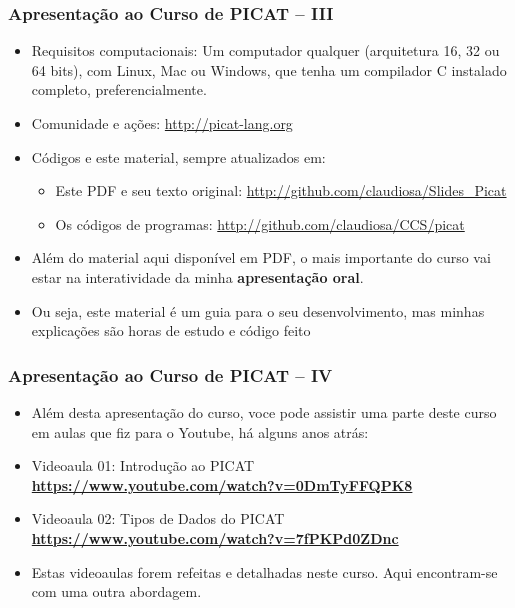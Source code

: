     
\begin{frame}[fragile]
  \frametitle{Apresentação ao Curso de PICAT -- III}
  \begin{itemize}

						
    \item Requisitos computacionais:
    \pause
    Um computador qualquer (arquitetura 16, 32 ou 64 bits), com Linux, Mac ou Windows,
    que tenha um compilador C instalado completo, preferencialmente.

    \item Comunidade e ações: \url{http://picat-lang.org}
    \pause

    \item Códigos e este material, sempre atualizados em: 
    \pause
    \begin{itemize}
      \item  Este PDF e seu texto original:  \url{http://github.com/claudiosa/Slides_Picat}
     \item   Os códigos de programas:  \url{http://github.com/claudiosa/CCS/picat}
    \end{itemize}

			\item Além do material aqui disponível em PDF, o mais importante  do curso
			 vai estar na interatividade
			da minha \textbf{apresentação oral}. 
			
			\item Ou seja, este material é  um guia para o seu desenvolvimento,
			 mas minhas explicações são
			horas de estudo e código feito

    
  \end{itemize}

\end{frame}


    
\begin{frame}[fragile]
  \frametitle{Apresentação ao Curso de PICAT -- IV}
  \begin{itemize}

    \item Além desta  apresentação do curso, voce pode assistir uma
    parte deste curso em aulas que fiz para o Youtube, há alguns anos atrás:

    \pause
    \item Videoaula 01: Introdução ao PICAT\\
    \textbf{\url {https://www.youtube.com/watch?v=0DmTyFFQPK8}}

    \pause 
    \item Videoaula 02: Tipos de Dados do PICAT\\
    \textbf{\url {https://www.youtube.com/watch?v=7fPKPd0ZDnc}} 
    
    \item Estas videoaulas forem refeitas e detalhadas neste curso.
    Aqui encontram-se com uma outra abordagem.
    
  \end{itemize}

\end{frame}




